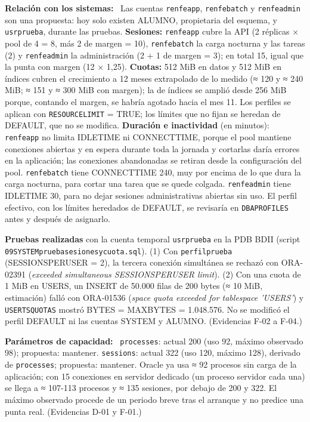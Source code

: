 \documentclass[11pt,a4paper]{article}
\DeclareRobustCommand{\_}{\textunderscore\allowbreak}
\newcommand{\tb}[1]{\texttt{#1}}
\newcommand{\campo}[1]{\textbf{#1:}~}                 %
\begin{document}
\campo{Relación con los sistemas} Las cuentas \tb{renfe\_app}, \tb{renfe\_batch} y \tb{renfe\_admin} son una propuesta: hoy solo existen ALUMNO, propietaria del esquema, y \tb{usr\_prueba}, durante las pruebas. \textbf{Sesiones:} \tb{renfe\_app} cubre la API (2 réplicas × pool de 4 = 8, más 2 de margen = 10), \tb{renfe\_batch} la carga nocturna y las tareas (2) y \tb{renfe\_admin} la administración (2 + 1 de margen = 3); en total 15, igual que la punta con margen (12 × 1,25). \textbf{Cuotas:} 512 MiB en datos y 512 MiB en índices cubren el crecimiento a 12 meses extrapolado de lo medido (≈ 120 y ≈ 240 MiB; ≈ 151 y ≈ 300 MiB con margen); la de índices se amplió desde 256 MiB porque, contando el margen, se habría agotado hacia el mes 11. Los perfiles se aplican con \tb{RESOURCE\_LIMIT} = TRUE; los límites que no fijan se heredan de DEFAULT, que no se modifica. \textbf{Duración e inactividad} (en minutos): \tb{renfe\_app} no limita IDLE\_TIME ni CONNECT\_TIME, porque el pool mantiene conexiones abiertas y en espera durante toda la jornada y cortarlas daría errores en la aplicación; las conexiones abandonadas se retiran desde la configuración del pool. \tb{renfe\_batch} tiene CONNECT\_TIME 240, muy por encima de lo que dura la carga nocturna, para cortar una tarea que se quede colgada. \tb{renfe\_admin} tiene IDLE\_TIME 30, para no dejar sesiones administrativas abiertas sin uso. El perfil efectivo, con los límites heredados de DEFAULT, se revisaría en \tb{DBA\_PROFILES} antes y después de asignarlo.

\textbf{Pruebas realizadas} con la cuenta temporal \tb{usr\_prueba} en la PDB BDII (script \tb{09\_SYSTEM\_prueba\_sesiones\_y\_cuota.sql}). (1) Con \tb{perfil\_prueba\_2} (SESSIONS\_PER\_USER = 2), la tercera conexión simultánea se rechazó con ORA-02391 (\emph{exceeded simultaneous SESSIONS\_PER\_USER limit}). (2) Con una cuota de 1 MiB en USERS, un INSERT de 50.000 filas de 200 bytes (≈ 10 MiB, estimación) falló con ORA-01536 (\emph{space quota exceeded for tablespace 'USERS'}) y \tb{USER\_TS\_QUOTAS} mostró BYTES = MAX\_BYTES = 1.048.576. No se modificó el perfil DEFAULT ni las cuentas SYSTEM y ALUMNO. (Evidencias F-02 a F-04.)

\campo{Parámetros de capacidad} \tb{processes}: actual 200 (uso 92, máximo observado 98); propuesta: mantener. \tb{sessions}: actual 322 (uso 120, máximo 128), derivado de \tb{processes}; propuesta: mantener. Oracle ya usa ≈ 92 procesos sin carga de la aplicación; con 15 conexiones en servidor dedicado (un proceso servidor cada una) se llega a ≈ 107-113 procesos y ≈ 135 sesiones, por debajo de 200 y 322. El máximo observado procede de un periodo breve tras el arranque y no predice una punta real. (Evidencias D-01 y F-01.)
\end{document}
